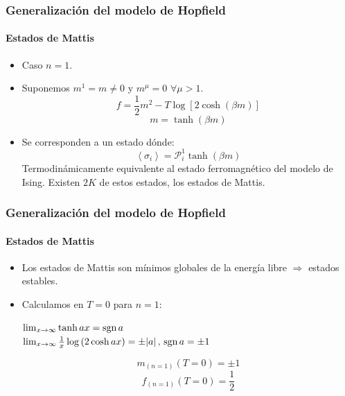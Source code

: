 \documentclass[11pt]{beamer}
\begin{document}
\begin{frame}
\frametitle{Generalización del modelo de Hopfield}
\framesubtitle{Estados de Mattis}
\begin{itemize}
	\item Caso $n=1$.
	\item Suponemos $m^1=m\neq0$ y $m^\mu = 0\,\,\forall \mu>1$.
	\begin{displaymath}
	f=\frac{1}{2}m^2 - T\log\left[2\cosh(\beta m)\right]
	\end{displaymath}
	\begin{displaymath}
	m=\tanh(\beta m)
	\end{displaymath}
	\item Se corresponden a un estado dónde:
	\begin{displaymath}
	\left<\sigma_i\right>=\mathcal{P}_i^1\tanh(\beta m)
	\end{displaymath}
	Termodinámicamente equivalente al estado ferromagnético del modelo de Ising. Existen $2K$ de estos estados, los estados de Mattis.
\end{itemize}
\end{frame}

\begin{frame}
\frametitle{Generalización del modelo de Hopfield}
\framesubtitle{Estados de Mattis}
\begin{itemize}
	\item Los estados de Mattis son mínimos globales de la energía libre $\Rightarrow$ estados estables.
	\item Calculamos en $T=0$ para $n=1$:
	\begin{center}
	$\lim_{x\rightarrow\infty}\tanh ax=\textnormal{sgn}\,a$ \\
	$\lim_{x\rightarrow\infty}\frac{1}{x}\log\left(2\cosh ax\right)=\pm|a|\,,\,\textnormal{sgn}\,a=\pm1$
	\end{center}
	
	\begin{displaymath}
	m_{(n=1)}(T=0)=\pm1
	\end{displaymath}
	\begin{displaymath}
	f_{(n=1)}(T=0)=\frac{1}{2}
	\end{displaymath}	
\end{itemize}
\end{frame}
\end{document}
